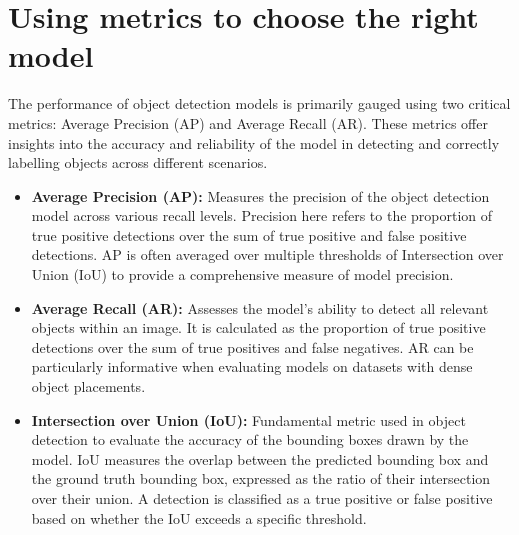 \documentclass[12pt,oneside]{book} %
\begin{document}
\section{Using metrics to choose the right model}

The performance of object detection models is primarily gauged using two
critical metrics: Average Precision (AP) and Average Recall (AR). These metrics
offer insights into the accuracy and reliability of the model in detecting and
correctly labelling objects across different scenarios.

\begin{itemize}
    \item \textbf{Average Precision (AP):} Measures the precision of the object detection model across various recall levels. Precision here refers to the proportion of true positive detections over the sum of true positive and false positive detections. AP is often averaged over multiple thresholds of Intersection over Union (IoU) to provide a comprehensive measure of model precision.
    \item \textbf{Average Recall (AR):} Assesses the model's ability to detect all relevant objects within an image. It is calculated as the proportion of true positive detections over the sum of true positives and false negatives. AR can be particularly informative when evaluating models on datasets with dense object placements.
    \item \textbf{Intersection over Union (IoU):} Fundamental metric used in object detection to evaluate the accuracy of the bounding boxes drawn by the model. IoU measures the overlap between the predicted bounding box and the ground truth bounding box, expressed as the ratio of their intersection over their union. A detection is classified as a true positive or false positive based on whether the IoU exceeds a specific threshold.
\end{itemize}
\end{document}

